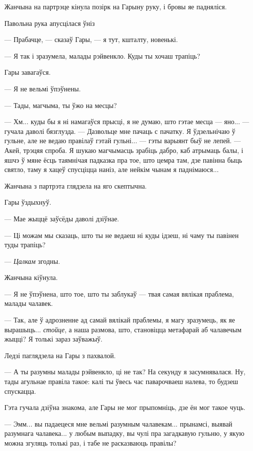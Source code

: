 Жанчына на партрэце кінула позірк на Гарыну руку, і бровы яе падняліся.

Павольна рука апусцілася ўніз

--- Прабачце, --- сказаў Гары, --- я тут, кшталту, новенькі.

--- Я так і зразумела, малады рэйвенкло. Куды ты хочаш трапіць?

Гары завагаўся.

--- Я не вельмі ўпэўнены.

--- Тады, магчыма, ты ўжо на месцы?

--- Хм... куды бы я ні намагаўся прысці, я не думаю, што гэтае месца --- яно... --- 
гучала даволі бязглузда. --- Дазвольце мне пачаць с пачатку. Я ўдзельнічаю ў 
гульне, але не ведаю правілаў гэтай гульні... --- гэты варыянт быў не лепей. ---
Акей, трэцяя спроба. Я шукаю магчымасць зрабіць дабро, каб атрымаць балы, і
яшчэ ў мяне ёсць таямнічая падказка пра тое, што цемра там, дзе павінна быць святло,
таму я хацеў спусціцца наніз, але нейкім чынам я паднімаюся...

Жанчына з партрэта глядзела на яго скептычна. 

Гары ўздыхнуў.

--- Мае жыццё заўсёды даволі дзіўнае.

--- Ці можам мы сказаць, што ты не ведаеш ні куды ідзеш, ні чаму ты павінен туды
трапіць?

--- \emph{Цалкам} згодны. 

Жанчына кіўнула.

--- Я не ўпэўнена, што тое, што ты заблукаў --- твая самая вялікая праблема, 
малады чалавек.

--- Так, але ў адрозненне ад самай вялікай праблемы, я магу зразумець, як 
яе вырашыць... \emph{стойце}, а наша размова, што, становіцца метафарай аб
чалавечым жыцці? Я толькі зараз заўважыў.

Ледзі паглядзела на Гары з пахвалой.

--- А ты разумны малады рэйвенкло, ці не так? На секунду я засумнявалася.
Ну, тады агульнае правіла такое: калі ты ўвесь час паварочваеш налева,
то будзеш спускацца.

Гэта гучала дзіўна знакома, але Гары не мог прыпомніць, дзе ён мог такое чуць.

--- Эмм... вы падаецеся мне вельмі разумным чалавекам... прынамсі, выявай разумнага
чалавека... у любым выпадку, вы чулі пра загадкавую гульню, у якую можна згуляць
толькі раз, і табе не расказваюць правілы?

